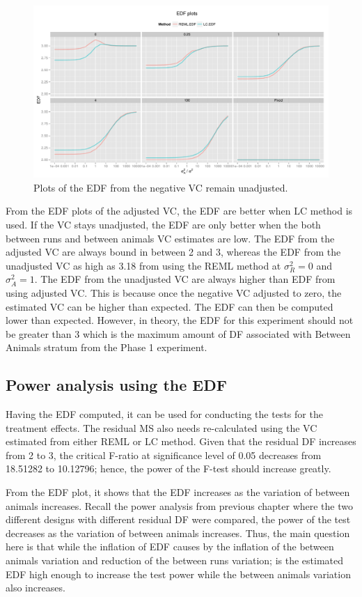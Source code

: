 \documentclass[12pt,a4paper]{article}
\begin{document}
\begin{figure}[ht]
\centering
\includegraphics[width=1 \textwidth]{Graph/CRD232Tag4Unadjusted.pdf}
\caption{Plots of the EDF from the negative VC remain unadjusted.}
\label{fig:EDFunadjusted}
\end{figure}

From the EDF plots of the adjusted VC, the EDF are better when LC method is used. If the VC stays unadjusted, the EDF are only better when the both between runs and between animals VC estimates are low. The EDF from the adjusted VC are always bound in between 2 and 3, whereas the EDF from the unadjusted VC as high as 3.18 from using the REML method at $\sigma^2_R = 0$ and $\sigma^2_A = 1$. The EDF from the unadjusted VC are always higher than EDF from using adjusted VC. This is because once the negative VC adjusted to zero, the estimated VC can be higher than expected. The EDF can then be computed lower than expected. However, in theory, the EDF for this experiment should not be greater than 3 which is the maximum amount of DF associated with Between Animals stratum from the Phase 1 experiment. 

\subsection{Power analysis using the EDF}
Having the EDF computed, it can be used for conducting the tests for the treatment effects. The residual MS also needs re-calculated using the VC estimated from either REML or LC method. Given that the residual DF increases from 2 to 3, the critical F-ratio at significance level of 0.05 decreases from 18.51282 to 10.12796; hence, the power of the F-test should increase greatly.  

From the EDF plot, it shows that the EDF increases as the variation of between animals increases. Recall the power analysis from previous chapter where the two different designs with different residual DF were compared, the power of the test decreases as the variation of between animals increases. Thus, the main question here is that while the inflation of EDF causes by the inflation of the between animals variation and reduction of the between runs variation; is the estimated EDF high enough to increase the test power while the between animals variation also increases. 
\end{document}
